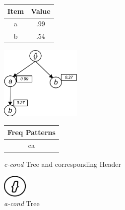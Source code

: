 \begin{figure}
\begin{minipage}{0.30\textwidth}
  \centering
	\begin{center}
	\begin{tabular}{ |c|c| } 
 	\hline
 		Item&Value\\ \hline\hline
 		a &  .99  	\\ \hline
 		b &  .54   	\\ \hline
\end{tabular}
\end{center}  
\end{minipage}
  \hfill
\begin{minipage}{0.29\textwidth}
  \centering
  \hfill
  \includegraphics[width=.8\textwidth, height=3.5cm]{../images/C_COND.jpg}
  \hfill  
\end{minipage}
\hfill
\begin{minipage}{0.30\textwidth}
  \centering  
	\begin{center}
	\begin{tabular}{ |c| } 
 	\hline
 		Freq Patterns \\ \hline\hline
 		ca  	\\ \hline
 		
\end{tabular}
\end{center}   
\end{minipage}
\caption{\emph{c-cond} Tree and corresponding Header}
\label{figure:c_cond}
\end{figure}
\begin{figure}
\centering
  \includegraphics[width=.10\textwidth, height=1.1cm]{../images/A_COND.jpg}
\caption{\emph{a-cond} Tree}
\label{figure:a_cond}
\end{figure}

%
